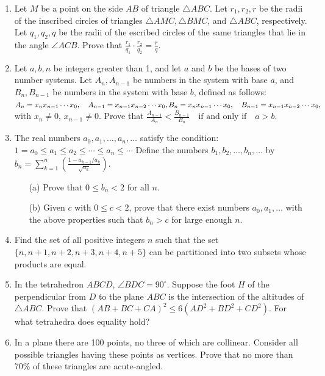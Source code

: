 \documentclass{article}
\begin{document}
\begin{enumerate}

    \item Let \( M \) be a point on the side \( AB \) of triangle \( \triangle ABC \). Let \( r_1, r_2, r \) be the radii of the inscribed circles of triangles \( \triangle AMC, \triangle BMC \), and \( \triangle ABC \), respectively. Let \( q_1, q_2, q \) be the radii of the escribed circles of the same triangles that lie in the angle \( \angle ACB \). Prove that
    $
    \frac{r_1}{q_1} \cdot \frac{r_2}{q_2} = \frac{r}{q}.
    $

    \item Let \( a, b, n \) be integers greater than 1, and let \( a \) and \( b \) be the bases of two number systems. Let \( A_n, A_{n-1} \) be numbers in the system with base \( a \), and \( B_n, B_{n-1} \) be numbers in the system with base \( b \), defined as follows:
    $
    A_n = x_nx_{n-1} \cdots x_0, \quad A_{n-1} = x_{n-1}x_{n-2} \cdots x_0, \\
    B_n = x_nx_{n-1} \cdots x_0, \quad B_{n-1} = x_{n-1}x_{n-2} \cdots x_0,
    $
    with \( x_n \ne 0 \), \( x_{n-1} \ne 0 \). Prove that
    $
    \frac{A_{n-1}}{A_n} < \frac{B_{n-1}}{B_n}
    \quad \text{if and only if} \quad a > b.
    $

    \item The real numbers \( a_0, a_1, \dots, a_n, \dots \) satisfy the condition:
    $
    1 = a_0 \le a_1 \le a_2 \le \cdots \le a_n \le \cdots
    $
    Define the numbers \( b_1, b_2, \dots, b_n, \dots \) by
    $
    b_n = \sum_{k=1}^{n} \left( \frac{1 - a_{k-1}/a_k}{\sqrt{a_k}} \right).
    $
    \begin{itemize}
        \item[(a)] Prove that \( 0 \le b_n < 2 \) for all \( n \).
        \item[(b)] Given \( c \) with \( 0 \le c < 2 \), prove that there exist numbers \( a_0, a_1, \dots \) with the above properties such that \( b_n > c \) for large enough \( n \).
    \end{itemize}

    \item Find the set of all positive integers \( n \) such that the set \( \{n, n+1, n+2, n+3, n+4, n+5\} \) can be partitioned into two subsets whose products are equal.

    \item In the tetrahedron \( ABCD \), \( \angle BDC = 90^\circ \). Suppose the foot \( H \) of the perpendicular from \( D \) to the plane \( ABC \) is the intersection of the altitudes of \( \triangle ABC \). Prove that
    $
    (AB + BC + CA)^2 \le 6(AD^2 + BD^2 + CD^2).
    $
    For what tetrahedra does equality hold?

    \item In a plane there are 100 points, no three of which are collinear. Consider all possible triangles having these points as vertices. Prove that no more than 70\% of these triangles are acute-angled.

\end{enumerate}
\end{document}
